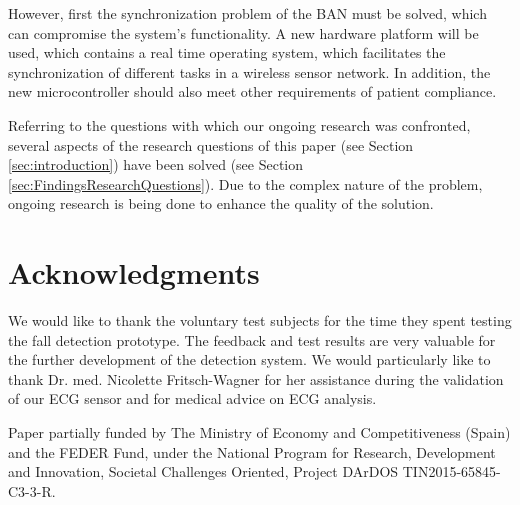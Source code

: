 \documentclass[10pt,journal,compsoc]{IEEEtran}
\begin{document}
However, first the synchronization problem of the BAN must be solved, which can compromise the system's functionality. A new hardware platform will be used, which contains a real time operating system, which facilitates the synchronization of different tasks in a wireless sensor network. In addition, the new microcontroller should also meet other requirements of patient compliance.

Referring to the questions with which our ongoing research was confronted, several aspects of the research questions of this paper (see Section \ref{sec:introduction}) have been solved (see Section \ref{sec:FindingsResearchQuestions}). Due to the complex nature of the problem, ongoing research is being done to enhance the quality of the solution.

\section*{Acknowledgments}
We would like to thank the voluntary test subjects for the time they spent testing the fall detection prototype. The feedback and test results are very valuable for the further development of the detection system. We would particularly like to thank Dr. med. Nicolette Fritsch-Wagner for her assistance during the validation of our ECG sensor and for medical advice on ECG analysis. 

Paper partially funded by The Ministry of Economy and Competitiveness (Spain) and the FEDER Fund, under the National Program for Research, Development and Innovation, Societal Challenges Oriented, Project DArDOS TIN2015-65845-C3-3-R.


%
%
\end{document}
